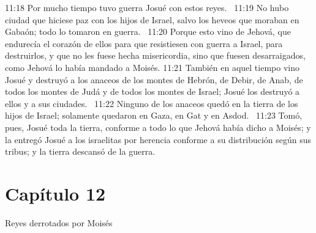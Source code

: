 11:18 Por mucho tiempo tuvo guerra Josué con estos reyes.  
11:19 No hubo ciudad que hiciese paz con los hijos de Israel, salvo los heveos que moraban en Gabaón; todo lo tomaron en guerra.  
11:20 Porque esto vino de Jehová, que endurecía el corazón de ellos para que resistiesen con guerra a Israel, para destruirlos, y que no les fuese hecha misericordia, sino que fuesen desarraigados, como Jehová lo había mandado a Moisés. 
11:21 También en aquel tiempo vino Josué y destruyó a los anaceos de los montes de Hebrón, de Debir, de Anab, de todos los montes de Judá y de todos los montes de Israel; Josué los destruyó a ellos y a sus ciudades.  
11:22 Ninguno de los anaceos quedó en la tierra de los hijos de Israel; solamente quedaron en Gaza, en Gat y en Asdod.  
11:23 Tomó, pues, Josué toda la tierra, conforme a todo lo que Jehová había dicho a Moisés; y la entregó Josué a los israelitas por herencia conforme a su distribución según sus tribus; y la tierra descansó de la guerra.  
\section*{Capítulo 12}
Reyes derrotados por Moisés  

